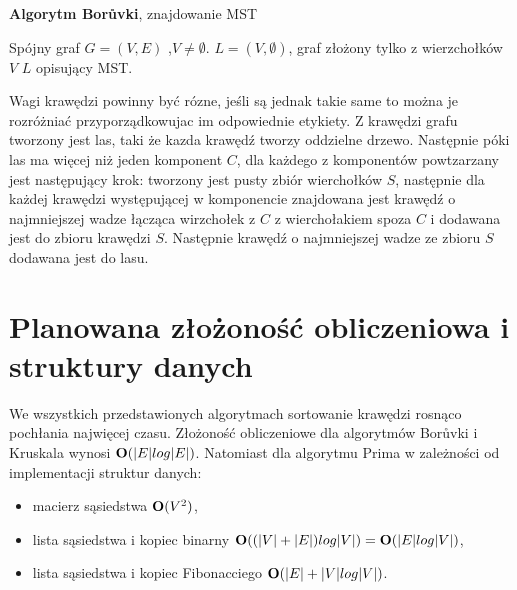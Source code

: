 \documentclass[a4paper, 10pt]{article}
\begin{document}
	
\begin{algorithm}
\caption{{\bf Algorytm Borůvki}, znajdowanie MST}
\begin{algorithmic}[!h]
\REQUIRE Spójny graf $G=(V,E)$ ,$V \neq \emptyset$. 
\ENSURE $L=(V,\emptyset)$, graf złożony tylko z wierzchołków $V$
\STATE {}
\STATE {}
\ENDFOR 
\ENDWHILE
\RETURN $L$ opisujący MST.
\end{algorithmic}
\end{algorithm}

\FloatBarrier

Wagi krawędzi powinny być rózne, jeśli są jednak takie same to można je rozróżniać przyporządkowujac im odpowiednie etykiety.
Z krawędzi grafu tworzony jest las, taki że kazda krawędź tworzy oddzielne drzewo. Następnie póki las ma więcej niż jeden komponent $C$, dla każdego
z komponentów powtzarzany jest następujący krok: tworzony jest pusty zbiór wierchołków $S$, następnie dla każdej krawędzi występującej w komponencie znajdowana
jest krawędź o najmniejszej wadze łącząca wirzchołek z $C$ z wierchołakiem spoza $C$ i dodawana jest do zbioru krawędzi $S$. Następnie krawędź o najmniejszej wadze ze zbioru
$S$ dodawana jest do lasu.
\section{Planowana złożoność obliczeniowa i struktury danych}

We wszystkich przedstawionych algorytmach sortowanie krawędzi rosnąco pochłania 
najwięcej czasu. Złożoność obliczeniowe dla algorytmów Borůvki i Kruskala wynosi
 ${\bf O}(|E| log |E|)$. Natomiast dla algorytmu Prima w zależności od implementacji struktur danych:

\begin{itemize}
\item{macierz sąsiedstwa ${\bf O}(V^2)$,} 
\item{lista sąsiedstwa i kopiec binarny ${\bf O}((|V| + |E|) log |V|) = {\bf O}(|E| log |V|)$,}
\item{lista sąsiedstwa i kopiec Fibonacciego  	${\bf O}(|E| + |V| log |V|)$.} 
\end{itemize}
\end{document}
